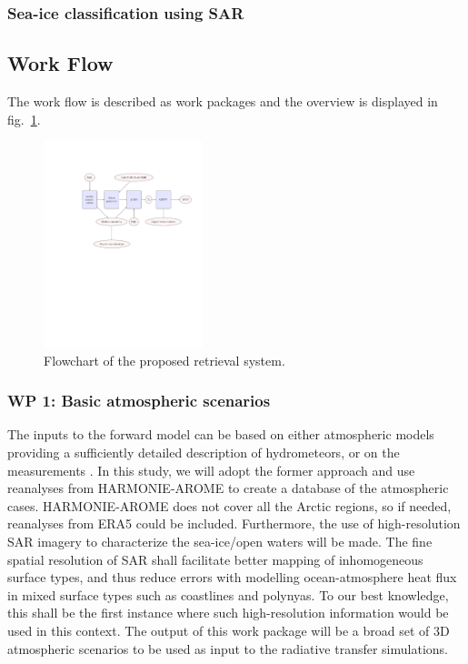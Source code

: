 \documentclass[12pt,oneside,a4paper]{article}
\begin{document}
\subsubsection{Sea-ice classification using SAR}



\subsection{Work Flow}
\label{sec:wp}
The work flow is described as work packages and the overview is displayed in fig.~\ref{fig:flowchart}. 

\begin{figure}[t]
	\centering
	\includegraphics[trim=140 370 40 125,clip,height = 60mm]{flowchart.pdf} 
	\caption{Flowchart of the proposed retrieval system.}
	\label{fig:flowchart}
\end{figure}

\subsubsection*{WP 1: Basic atmospheric scenarios}
%

\label{sec:atmscenes}
The inputs to the forward model can be based on either atmospheric models providing a sufficiently detailed description of hydrometeors, or on the measurements \citep{ekelund:using:20}. In this study, we will adopt the former approach and use reanalyses from HARMONIE-AROME to create a database of the atmospheric cases. HARMONIE-AROME does not cover all the Arctic regions, so if needed, reanalyses from ERA5 could be included. Furthermore, the use of high-resolution SAR imagery to characterize the sea-ice/open waters will be made. The fine spatial resolution of SAR shall facilitate better mapping of inhomogeneous surface types, and thus reduce errors with modelling ocean-atmosphere heat flux in mixed surface types such as coastlines and polynyas. To our best knowledge, this shall be the first instance where such high-resolution information would be used in this context. 
The output of this work package will be a broad set of 3D atmospheric scenarios to be used as input to the radiative transfer simulations.
\end{document}
